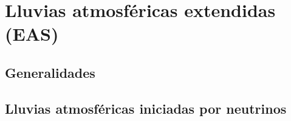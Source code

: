 \chapter{Lluvias atmosf\'ericas extendidas (EAS)}

\section{Generalidades}

\section{Lluvias atmosf\'ericas iniciadas por neutrinos}
